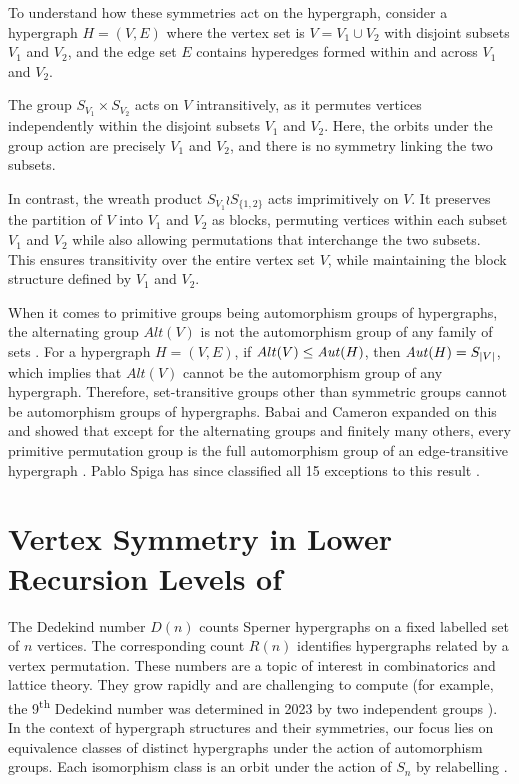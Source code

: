 To understand how these symmetries act on the hypergraph, consider a hypergraph $H=(V,E)$ where the vertex set is $V=V_1\cup V_2$ with disjoint subsets $V_1$ and $V_2$, and the edge set $E$ contains hyperedges formed within and across $V_1$ and $V_2$.

The group $S_{V_1}\times S_{V_2}$ acts on $V$ intransitively, as it permutes vertices independently within the disjoint subsets $V_1$ and $V_2$. Here, the orbits under the group action are precisely $V_1$ and $V_2$, and there is no symmetry linking the two subsets.

In contrast, the wreath product $S_{V_1}\wr S_{\{1,2\}}$ acts imprimitively on $V$. It preserves the partition of $V$ into $V_1$ and $V_2$ as blocks, permuting vertices within each subset $V_1$ and $V_2$ while also allowing permutations that interchange the two subsets. This ensures transitivity over the entire vertex set $V$, while maintaining the block structure defined by $V_1$ and $V_2$.

When it comes to primitive groups being automorphism groups of hypergraphs, the alternating group $Alt(V)$ is not the automorphism group of any family of sets . For a hypergraph $H=(V,E)$, if $Alt(V)\leq\mathit{Aut}(H)$, then $\mathit{Aut}(H)=S_{|V|}$, which implies that $Alt(V)$ cannot be the automorphism group of any hypergraph. Therefore, set-transitive groups other than symmetric groups cannot be automorphism groups of hypergraphs. Babai and Cameron expanded on this and showed that except for the alternating groups and finitely many others, every primitive permutation group is the full automorphism group of an edge-transitive hypergraph \cite{BC15}. Pablo Spiga has since classified all 15 exceptions to this result \cite{Spi16}.

\section{Vertex Symmetry in Lower Recursion Levels of \FKA}

The Dedekind number $D(n)$ counts Sperner hypergraphs on a fixed labelled set of $n$ vertices. The corresponding count $R(n)$ identifies hypergraphs related by a vertex permutation. These numbers are a topic of interest in combinatorics and lattice theory. They grow rapidly and are challenging to compute (for example, the 9\textsuperscript{th} Dedekind number was determined in 2023 by two independent groups \cite{Cro23}). In the context of hypergraph structures and their symmetries, our focus lies on equivalence classes of distinct hypergraphs under the action of automorphism groups. Each isomorphism class is an orbit under the action of $S_n$ by relabelling \cite{SY14}.

